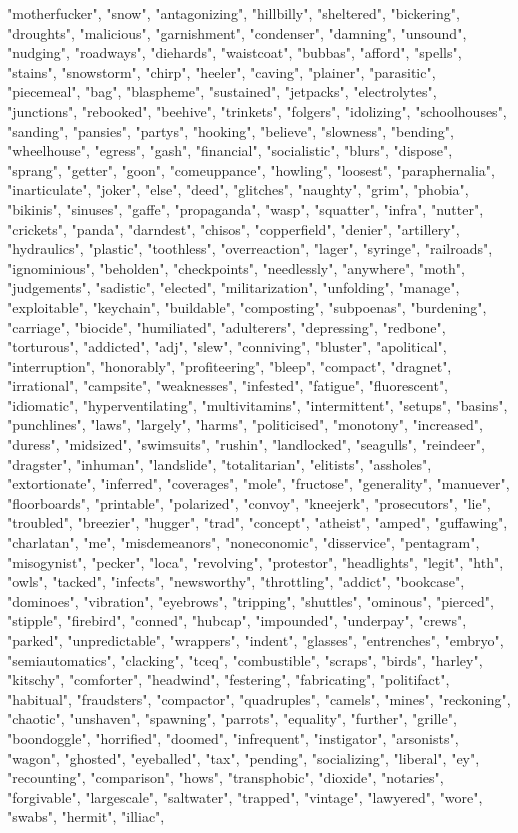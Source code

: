 "motherfucker", "snow", "antagonizing", "hillbilly", "sheltered", "bickering", "droughts", "malicious", "garnishment", "condenser", "damning", "unsound", "nudging", "roadways", "diehards", "waistcoat", "bubbas", "afford", "spells", "stains", "snowstorm", "chirp", "heeler", "caving", "plainer", "parasitic", "piecemeal", "bag", "blaspheme", "sustained", "jetpacks", "electrolytes", "junctions", "rebooked", "beehive", "trinkets", "folgers", "idolizing", "schoolhouses", "sanding", "pansies", "partys", "hooking", "believe", "slowness", "bending", "wheelhouse", "egress", "gash", "financial", "socialistic", "blurs", "dispose", "sprang", "getter", "goon", "comeuppance", "howling", "loosest", "paraphernalia", "inarticulate", "joker", "else", "deed", "glitches", "naughty", "grim", "phobia", "bikinis", "sinuses", "gaffe", "propaganda", "wasp", "squatter", "infra", "nutter", "crickets", "panda", "darndest", "chisos", "copperfield", "denier", "artillery", "hydraulics", "plastic", "toothless", "overreaction", "lager", "syringe", "railroads", "ignominious", "beholden", "checkpoints", "needlessly", "anywhere", "moth", "judgements", "sadistic", "elected", "militarization", "unfolding", "manage", "exploitable", "keychain", "buildable", "composting", "subpoenas", "burdening", "carriage", "biocide", "humiliated", "adulterers", "depressing", "redbone", "torturous", "addicted", "adj", "slew", "conniving", "bluster", "apolitical", "interruption", "honorably", "profiteering", "bleep", "compact", "dragnet", "irrational", "campsite", "weaknesses", "infested", "fatigue", "fluorescent", "idiomatic", "hyperventilating", "multivitamins", "intermittent", "setups", "basins", "punchlines", "laws", "largely", "harms", "politicised", "monotony", "increased", "duress", "midsized", "swimsuits", "rushin", "landlocked", "seagulls", "reindeer", "dragster", "inhuman", "landslide", "totalitarian", "elitists", "assholes", "extortionate", "inferred", "coverages", "mole", "fructose", "generality", "manuever", "floorboards", "printable", "polarized", "convoy", "kneejerk", "prosecutors", "lie", "troubled", "breezier", "hugger", "trad", "concept", "atheist", "amped", "guffawing", "charlatan", "me", "misdemeanors", "noneconomic", "disservice", "pentagram", "misogynist", "pecker", "loca", "revolving", "protestor", "headlights", "legit", "hth", "owls", "tacked", "infects", "newsworthy", "throttling", "addict", "bookcase", "dominoes", "vibration", "eyebrows", "tripping", "shuttles", "ominous", "pierced", "stipple", "firebird", "conned", "hubcap", "impounded", "underpay", "crews", "parked", "unpredictable", "wrappers", "indent", "glasses", "entrenches", "embryo", "semiautomatics", "clacking", "tceq", "combustible", "scraps", "birds", "harley", "kitschy", "comforter", "headwind", "festering", "fabricating", "politifact", "habitual", "fraudsters", "compactor", "quadruples", "camels", "mines", "reckoning", "chaotic", "unshaven", "spawning", "parrots", "equality", "further", "grille", "boondoggle", "horrified", "doomed", "infrequent", "instigator", "arsonists", "wagon", "ghosted", "eyeballed", "tax", "pending", "socializing", "liberal", "ey", "recounting", "comparison", "hows", "transphobic", "dioxide", "notaries", "forgivable", "largescale", "saltwater", "trapped", "vintage", "lawyered", "wore", "swabs", "hermit", "illiac", 